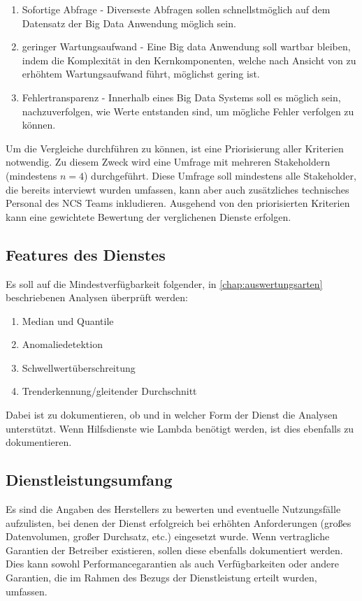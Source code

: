 \begin{enumerate}
\item Sofortige Abfrage  - 
Diverseste Abfragen sollen schnellstmöglich auf dem Datensatz der Big Data Anwendung möglich sein.

\item geringer Wartungsaufwand  - 
Eine Big data Anwendung soll wartbar bleiben, indem die Komplexität in den Kernkomponenten, welche nach Ansicht von \citeauthor{Marz.2015} zu erhöhtem Wartungsaufwand führt, möglichst gering ist.

\item Fehlertransparenz  - 
Innerhalb eines Big Data Systems soll es möglich sein, nachzuverfolgen, wie Werte entstanden sind, um mögliche Fehler verfolgen zu können.
\end{enumerate}

Um die Vergleiche durchführen zu können, ist eine Priorisierung aller Kriterien notwendig. Zu diesem Zweck wird eine Umfrage mit mehreren Stakeholdern (mindestens $n=4$) durchgeführt. Diese Umfrage soll mindestens alle Stakeholder, die bereits interviewt wurden umfassen, kann aber auch zusätzliches technisches Personal des \ac{NCS} Teams inkludieren. Ausgehend von den priorisierten Kriterien kann eine gewichtete Bewertung der verglichenen Dienste erfolgen.


\subsection{Features des Dienstes}
Es soll auf die Mindestverfügbarkeit folgender, in \autoref{chap:auswertungsarten} beschriebenen Analysen überprüft werden:

\begin{enumerate}
\item Median und Quantile
\item Anomaliedetektion
\item Schwellwertüberschreitung
\item Trenderkennung/gleitender Durchschnitt
\end{enumerate}

Dabei ist zu dokumentieren, ob und in welcher Form der Dienst die Analysen unterstützt. Wenn Hilfsdienste wie Lambda benötigt werden, ist dies ebenfalls zu dokumentieren.

\subsection{Dienstleistungsumfang}
Es sind die Angaben des Herstellers zu bewerten und eventuelle Nutzungsfälle aufzulisten, bei denen der Dienst erfolgreich bei erhöhten Anforderungen (großes Datenvolumen, großer Durchsatz, etc.) eingesetzt wurde. Wenn vertragliche Garantien der Betreiber existieren, sollen diese ebenfalls dokumentiert werden. Dies kann sowohl Performancegarantien als auch Verfügbarkeiten oder andere Garantien, die im Rahmen des Bezugs der Dienstleistung erteilt wurden, umfassen.

